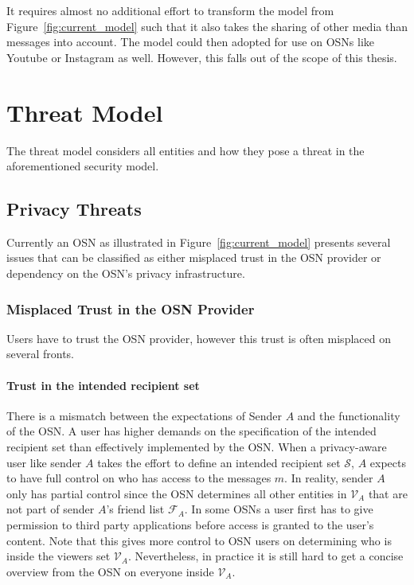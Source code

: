 It requires almost no additional effort to transform the model from Figure~\ref{fig:current_model} such that it also takes the sharing of other media than messages into account. The model could then adopted for use on OSNs like Youtube or Instagram as well. However, this falls out of the scope of this thesis.

\section{Threat Model}
\label{sec:threat_model}
The threat model considers all entities and how they pose a threat in the aforementioned security model.

\subsection{Privacy Threats}
\label{sec:issues_with_current_osn_situation}
Currently an OSN as illustrated in Figure~\ref{fig:current_model} presents several issues that can be classified as either misplaced trust in the OSN provider or dependency on the OSN's privacy infrastructure.

\subsubsection{Misplaced Trust in the OSN Provider}
Users have to trust the OSN provider, however this trust is often misplaced on several fronts.

\paragraph{Trust in the intended recipient set} There is a mismatch between the expectations of Sender $A$ and the functionality of the OSN. A user has higher demands on the specification of the intended recipient set than effectively implemented by the OSN. When a privacy-aware user like sender $A$ takes the effort to define an intended recipient set $\mathcal{S}$, $A$ expects to have full control on who has access to the messages $m$. In reality, sender $A$ only has partial control since the OSN determines all other entities in $\mathcal{V}_A$ that are not part of sender $A$'s friend list $\mathcal{F}_A$. In some OSNs a user first has to give permission to third party applications before access is granted to the user's content. Note that this gives more control to OSN users on determining who is inside the viewers set $\mathcal{V}_A$. Nevertheless, in practice it is still hard to get a concise overview from the OSN on everyone inside $\mathcal{V}_A$.

